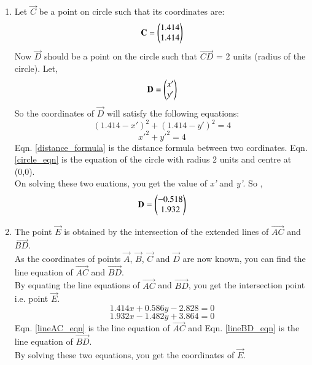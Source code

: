 \begin{enumerate}[label=\thesection.\arabic*.,ref=\thesection.\theenumi]
\item 
Let $\vec{C}$ be a point on circle such that its coordinates are:
\begin{align}
\mathbf{C}= \begin{pmatrix}1.414\\1.414\end{pmatrix}
\label{eq:constr_c}
\end{align}
Now $\vec{D}$ should be a point on the circle such that $\vec{CD}$ = 2 units (radius of the circle).
Let,
\begin{align}
\mathbf{D}= \begin{pmatrix}x'\\y'\end{pmatrix}
\end{align}
So the coordinates of $\vec{D}$ will satisfy the following equations:
\begin{equation} \label{distance_formula}
(1.414-x')^{2} + (1.414-y')^{2} = 4  
\end{equation}
\begin{equation} \label{circle_eqn}
x'^{2} + y'^{2} = 4  
\end{equation}
Eqn. \ref{distance_formula} is the distance formula between two cordinates. Eqn. \ref{circle_eqn} is the equation of the circle with radius 2 units and centre at (0,0). \\
On solving these two euations, you get the value of \textit{x'} and \textit{y'}. So ,
\begin{align}
\mathbf{D}= \begin{pmatrix}-0.518\\1.932\end{pmatrix}
\label{eq:constr_d}
\end{align}
\item The point $\vec{E}$ is obtained by the intersection of the extended lines of $\vec{AC}$ and $\vec{BD}$. \\
As the coordinates of points $\vec{A}$, $\vec{B}$, $\vec{C}$ and $\vec{D}$ are now known, you can find the line equation of $\vec{AC}$ and $\vec{BD}$.\\
By equating the line equations of $\vec{AC}$ and $\vec{BD}$, you get the intersection point i.e. point $\vec{E}$. \\
\begin{equation} \label{lineAC_eqn}
1.414x + 0.586y - 2.828 = 0
\end{equation}
\begin{equation} \label{lineBD_eqn}
1.932x - 1.482y + 3.864 = 0
\end{equation}
Eqn. \ref{lineAC_eqn} is the line equation of $\vec{AC}$ and Eqn. \ref{lineBD_eqn} is the line equation of $\vec{BD}$. \\ 
By solving these two equations, you get the coordinates of $\vec{E}$. 
\begin{align}

\end{align}
\end{enumerate}
